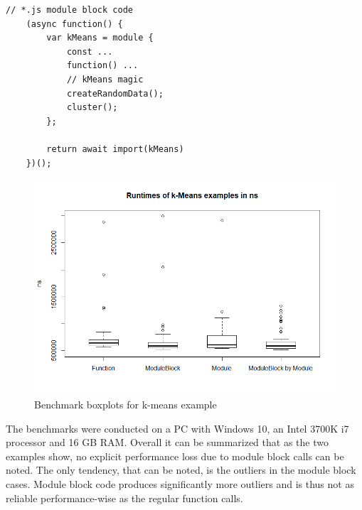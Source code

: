 \begin{lstlisting}[caption={Module block toy example}, label={fig:kMeans}]
    // *.js module block code
    (async function() {
        var kMeans = module {
            const ...
            function() ...
            // kMeans magic
            createRandomData();
            cluster();
        };
        
        return await import(kMeans)
    })();
\end{lstlisting}

\begin{figure}[h!]
    \centering
    \includegraphics[scale=0.7]{figures/runtimesKMeansBoxplot.png}
    \caption{Benchmark boxplots for k-means example}
    \label{fig:bKMeans}
\end{figure}
\pagebreak
The benchmarks were conducted on a PC with Windows 10, an Intel 3700K i7 processor and 16 GB RAM. Overall it can be summarized that as the two examples show, no explicit performance loss due to module block calls can be noted. The only tendency, that can be noted, is the outliers in the module block cases. Module block code produces significantly more outliers and is thus not as reliable performance-wise as the regular function calls. 